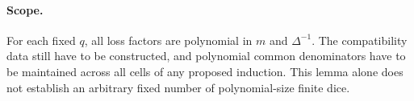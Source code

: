 \documentclass[11pt]{article}
\begin{document}
\paragraph{Scope.}
For each fixed $q$, all loss factors are polynomial in $m$ and
$\Delta^{-1}$. The compatibility data still have to be constructed,
and polynomial common denominators have to be maintained across all
cells of any proposed induction. This lemma alone does not establish
an arbitrary fixed number of polynomial-size finite dice.
\end{document}

